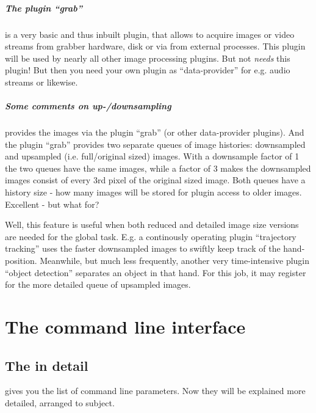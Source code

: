 \paragraph {The plugin ``grab''}

is a very basic and thus inbuilt plugin, that allows to acquire
images or video streams from grabber hardware, disk or via \dacs{}
from external processes. This plugin will be used by nearly all
other image processing plugins. But \icewing{} not {\em needs} this
plugin! But then you need your own plugin as ``data-provider'' for
e.g. audio streams or likewise.

\paragraph {Some comments on up-/downsampling}

\icewing{} provides the images via the plugin ``grab'' (or other
data-provider plugins). And the plugin ``grab'' provides two
separate queues of image histories: downsampled and upsampled
(i.e. full/original sized) images. With a downsample factor of 1 the
two queues have the same images, while a factor of 3 makes the
downsampled images consist of every 3rd pixel of the original sized
image. Both queues have a history size - how many images will be
stored for plugin access to older images. Excellent - but what for?

Well, this feature is useful when both reduced and detailed image
size versions are needed for the global task. E.g. a continously
operating plugin ``trajectory tracking'' uses the faster downsampled
images to swiftly keep track of the hand-position. Meanwhile, but
much less frequently, another very time-intensive plugin ``object
detection'' separates an object in that hand. For this job, it may
register for the more detailed queue of upsampled images.

\chapter{The command line interface}

\section {The  in detail}
\label{sec:commandline}

\sE
gives you the list of command line parameters. Now they will be
explained more detailed, arranged to subject.

